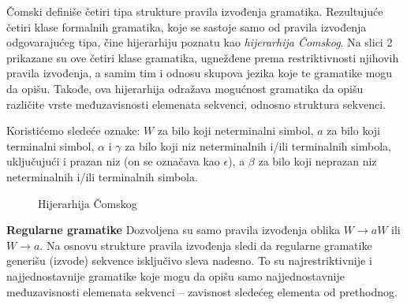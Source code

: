 \documentclass[a4paper, 12pt]{article}
\begin{document}
Čomski definiše četiri tipa strukture pravila izvođenja gramatika. Rezultujuće četiri klase formalnih gramatika, koje se sastoje samo od pravila izvođenja odgovarajućeg tipa, čine hijerarhiju poznatu kao \textit{hijerarhija Čomskog}. Na slici 2 prikazane su ove četiri klase gramatika, ugnežđene prema restriktivnosti njihovih pravila izvođenja, a samim tim i odnosu skupova jezika koje te gramatike mogu da opišu. Takođe, ova hijerarhija odražava mogućnost gramatika da opišu različite vrste međuzavisnosti elemenata sekvenci, odnosno struktura sekvenci.

Koristićemo sledeće oznake: $W$ za bilo koji neterminalni simbol, $a$ za bilo koji terminalni simbol, $\alpha$ i $\gamma$ za bilo koji niz neterminalnih i/ili terminalnih simbola, uključujući i prazan niz (on se označava kao $\epsilon$), a $\beta$ za bilo koji neprazan niz neterminalnih i/ili terminalnih simbola.

\begin{figure}[h!]
    \centering
    \vspace{0.15cm}
    \caption{Hijerarhija Čomskog}
    \vspace{0.15cm}
\end{figure}

\noindent \textbf{Regularne gramatike} \hspace{0.3cm} Dozvoljena su samo pravila izvođenja oblika $W \rightarrow aW$ ili $W \rightarrow a$. Na osnovu strukture pravila izvođenja sledi da regularne gramatike generišu (izvode) sekvence isključivo sleva nadesno. To su najrestriktivnije i najjednostavnije gramatike koje mogu da opišu samo najjednostavnije međuzavisnosti elemenata sekvenci -- zavisnost sledećeg elementa od prethodnog. 
\end{document}
